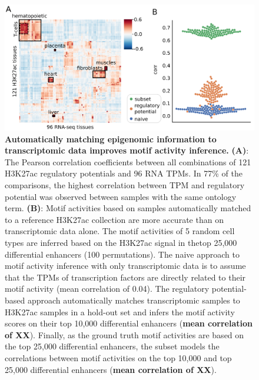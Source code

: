 \begin{figure}
    \centering
    \includegraphics[width=1\linewidth]{ch.scepia/imgs/celltypes.png}
    \caption{\textbf{Automatically matching epigenomic information to transcriptomic data improves motif activity inference.} \textbf{(A)}: The Pearson correlation coefficients between all combinations of 121 H3K27ac regulatory potentials and 96 RNA TPMs. In 77\% of the comparisons, the highest correlation between TPM and regulatory potential was observed between samples with the same ontology term. \textbf{(B)}: Motif activities based on samples automatically matched to a reference H3K27ac collection are more accurate than on transcriptomic data alone. The motif activities of 5 random cell types are inferred based on the H3K27ac signal in thetop 25,000 differential enhancers (100 permutations). The naive approach to motif activity inference with only transcriptomic data is to assume that the TPMs of transcription factors are directly related to their motif activity (mean correlation of 0.04). The regulatory potential-based approach automatically matches transcriptomic samples to H3K27ac samples in a hold-out set and infers the motif activity scores on their top 10,000 differential enhancers (\textbf{mean correlation of XX}). Finally, as the ground truth motif activities are based on the top 25,000 differential enhancers, the subset models the correlations between motif activities on the top 10,000 and top 25,000 differential enhancers (\textbf{mean correlation of XX}).}
    \label{fig:bulk_comparison}
\end{figure}

